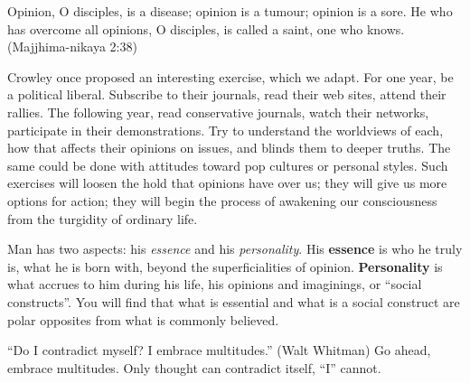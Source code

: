 \begin{quotex}
Opinion, O disciples, is a disease; opinion is a tumour; opinion is a sore. He who has overcome all opinions, O disciples, is called a saint, one who knows. (Majjhima-nikaya 2:38) 

\end{quotex}
Crowley once proposed an interesting exercise, which we adapt. For one year, be a political liberal. Subscribe to their journals, read their web sites, attend their rallies. The following year, read conservative journals, watch their networks, participate in their demonstrations. Try to understand the worldviews of each, how that affects their opinions on issues, and blinds them to deeper truths. The same could be done with attitudes toward pop cultures or personal styles. Such exercises will loosen the hold that opinions have over us; they will give us more options for action; they will begin the process of awakening our consciousness from the turgidity of ordinary life. 

Man has two aspects: his \emph{essence} and his \emph{personality}. His \textbf{essence} is who he truly is, what he is born with, beyond the superficialities of opinion. \textbf{Personality} is what accrues to him during his life, his opinions and imaginings, or “social constructs”. You will find that what is essential and what is a social construct are polar opposites from what is commonly believed. 

“Do I contradict myself? I embrace multitudes.” (Walt Whitman) Go ahead, embrace multitudes. Only thought can contradict itself, “I” cannot.



